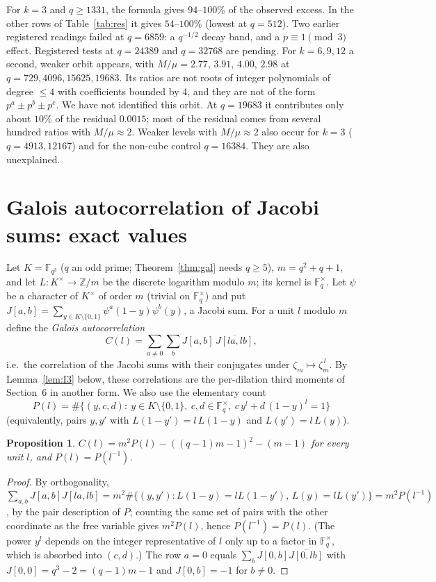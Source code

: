 \documentclass[11pt]{article}
\newtheorem{proposition}{Proposition}
\begin{document}
For $k=3$ and $q\ge1331$, the formula gives $94$--$100\%$ of the observed excess. In the other rows of Table~\ref{tab:res} it gives $54$--$100\%$ (lowest at $q=512$).
Two earlier registered readings failed at $q=6859$: a $q^{-1/2}$ decay band, and a $p\equiv1\pmod3$ effect. Registered tests at $q=24389$ and $q=32768$ are pending.
For $k=6,9,12$ a second, weaker orbit appears, with $M/\mu=2.77,\,3.91,\,4.00,\,2.98$ at $q=729,4096,15625,19683$. Its ratios are not roots of integer
polynomials of degree $\le4$ with coefficients bounded by 4, and they are not of the form $p^a\pm p^b\pm p^c$. We have not identified this orbit.
At $q=19683$ it contributes only about $10\%$ of the residual $0.0015$; most of the residual comes from several hundred ratios with $M/\mu\approx2$.
Weaker levels with $M/\mu\approx2$ also occur for $k=3$ ($q=4913,12167$) and for the non-cube control $q=16384$. They are also unexplained.

\section{Galois autocorrelation of Jacobi sums: exact values}\label{sec:gal}
Let $K=\mathbb F_{q^3}$ ($q$ an odd prime; Theorem~\ref{thm:gal} needs $q\ge5$), $m=q^2+q+1$, and let $L:K^\times\to\mathbb Z/m$ be the discrete logarithm modulo $m$; its kernel is
$\mathbb F_q^\times$. Let $\psi$ be a character of $K^\times$ of order $m$ (trivial on $\mathbb F_q^\times$) and put
$J[a,b]=\sum_{y\in K\setminus\{0,1\}}\psi^a(1-y)\psi^b(y)$, a Jacobi sum. For a unit $l$ modulo $m$ define the \emph{Galois autocorrelation}
\[C(l)=\sum_{a\ne0}\sum_{b}J[a,b]\,\overline{J[la,lb]},\]
i.e.\ the correlation of the Jacobi sums with their conjugates under $\zeta_m\mapsto\zeta_m^{\,l}$. By Lemma~\ref{lem:I3} below, these correlations are
the per-dilation third moments of Section~6 in another form. We also use the elementary count
\[P(l)=\#\{(y,c,d):\ y\in K\setminus\{0,1\},\ c,d\in\mathbb F_q^\times,\ c\,y^l+d\,(1-y)^l=1\}\]
(equivalently, pairs $y,y'$ with $L(1-y')=l\,L(1-y)$ and $L(y')=l\,L(y)$).

\begin{proposition}\label{prop:gal}
$C(l)=m^2P(l)-((q-1)m-1)^2-(m-1)$ for every unit $l$, and $P(l)=P(l^{-1})$.
\end{proposition}
\begin{proof}
By orthogonality, $\sum_{a,b}J[a,b]\overline{J[la,lb]}=m^2\#\{(y,y'):L(1-y)=lL(1-y'),\,L(y)=lL(y')\}=m^2P(l^{-1})$, by the pair description of $P$; counting the same set of pairs with the other coordinate as the free variable gives $m^2P(l)$, hence
$P(l^{-1})=P(l)$. (The power $y^l$ depends on the integer representative of $l$ only up to a factor in $\mathbb F_q^\times$, which is absorbed into $(c,d)$.) The row $a=0$ equals $\sum_b J[0,b]\overline{J[0,lb]}$ with $J[0,0]=q^3-2=(q-1)m-1$ and $J[0,b]=-1$ for $b\ne0$.
\end{proof}
\end{document}
